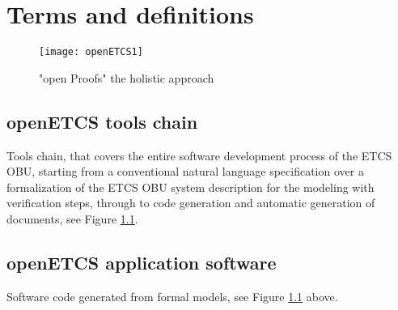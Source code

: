 \documentclass{template/openetcs_report}
\begin{document}
\mainmatter

\chapter{Terms and definitions}
\label{common-terms}

\begin{figure}[h]
  \centering
  \texttt{[image: openETCS1]}
  \caption{"open Proofs" the holistic approach}
  \label{fig:openETCS1}
\end{figure}


\section{openETCS tools chain}
Tools chain, that covers the entire software development process of the ETCS OBU,
starting from a conventional natural language specification over a formalization of the ETCS OBU system
description for the modeling with verification steps, through to code generation
and automatic generation of documents, see Figure \ref{fig:openETCS1}.
\\


\section{openETCS application software}
Software code generated from formal models, see Figure \ref{fig:openETCS1} above.\\
\end{document}
